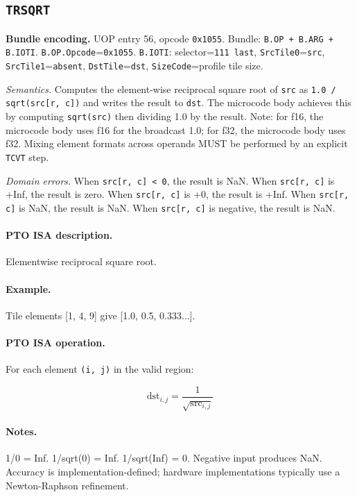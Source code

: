 \subsection{\texttt{TRSQRT}}
\noindent\textbf{Bundle encoding.} UOP entry 56, opcode \texttt{0x1055}. Bundle: \texttt{B.OP + B.ARG + B.IOTI}. \texttt{B.OP.Opcode}=\texttt{0x1055}. \texttt{B.IOTI}: selector=\texttt{111 last}, \texttt{SrcTile0}=\texttt{src}, \texttt{SrcTile1}=\texttt{absent}, \texttt{DstTile}=\texttt{dst}, \texttt{SizeCode}=profile tile size.\par\smallskip

\textit{Semantics.} Computes the element-wise reciprocal square root of \texttt{src} as \texttt{1.0 / sqrt(src[r, c])} and writes the result to \texttt{dst}. The microcode body achieves this by computing \texttt{sqrt(src)} then dividing 1.0 by the result. Note: for f16, the microcode body uses f16 for the broadcast 1.0; for f32, the microcode body uses f32. Mixing element formats across operands MUST be performed by an explicit \texttt{TCVT} step.

\textit{Domain errors.} When \texttt{src[r, c] < 0}, the result is NaN. When \texttt{src[r, c]} is +Inf, the result is zero. When \texttt{src[r, c]} is +0, the result is +Inf. When \texttt{src[r, c]} is NaN, the result is NaN. When \texttt{src[r, c]} is negative, the result is NaN.\par\smallskip
{\small
\paragraph{PTO ISA description.}
Elementwise reciprocal square root.
\paragraph{Example.}
Tile elements [1, 4, 9] give [1.0, 0.5, 0.333...].
\par\smallskip
\paragraph{PTO ISA operation.}
For each element \texttt{(i, j)} in the valid region:

\[
\mathrm{dst}_{i,j} = \frac{1}{\sqrt{\mathrm{src}_{i,j}}}
\]
}\par\smallskip
\paragraph{Notes.}
1/0 = Inf. 1/sqrt(0) = Inf. 1/sqrt(Inf) = 0. Negative input produces NaN. Accuracy is implementation-defined; hardware implementations typically use a Newton-Raphson refinement.
